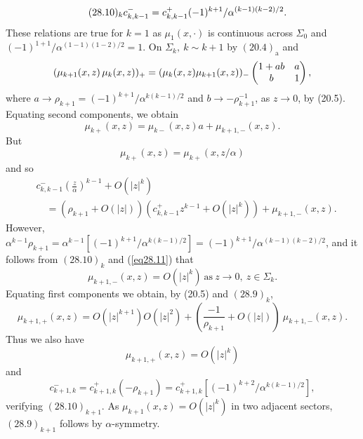 \documentclass{surv-l}
\theoremstyle{plain}
\theoremstyle{definition}
\numberwithin{equation}{chapter}
\begin{document}
\begin{align*}\tag*{$(28.10)_{k}$}
& c_{k,k-1}^{-}=c_{k,k-1}^{+}(-1)^{k+1}/\alpha^{(k-1)(k-2)/2}.
\end{align*}
These relations are true for $k=1$ as $\mu_{1}(x, \cdot)$ is continuous across $\Sigma_{0}$ and $(-1)^{1+1}/\alpha^{(1-1)(1-2)/2}=1$. On $\Sigma_{k},\ k\sim k+1$ by $(20.4)_{\mathrm{a}}$ and
\begin{equation*}
(\mu_{k+1}(x, z)\,\mu_{k}(x,z))_{+}=(\mu_{k}
(x, z)\mu_{k+1}(x, z))_{-}\left(\begin{array}{@{}cc@{}}
1+ab & a\\
b  &1
\end{array}\right),
\end{equation*}
where $a\rightarrow\rho_{k+1}=(-1)^{k+1}/\alpha^{k(k-1)/2}$ and $b\rightarrow-\rho_{k+1}^{-1}$, as $z\rightarrow 0$, by (20.5).
 Equating second components, we obtain
\begin{equation*}
\mu_{k+} (x, z) =\mu_{k-}(x,z)a+\mu_{k+1,-}(x,z).
\end{equation*}
But
\begin{equation*}
\mu_{k+}(x, z)=\mu_{k+}(x, z/\alpha)
\end{equation*}
and so
\setcounter{equation}{10}
\begin{align}\label{eq28.11}
&c_{k,k-1}^{-}\left(\frac{z}{\alpha}\right)^{k-1}+O(|z|^{k})\\
&\quad=(\rho_{k+1}+O(|z|))(c_{k
,k-1}^{+}z^{k-1}+O(|z|^{k}))+\mu_{k+1,-}(x,z).\nonumber
\end{align}
However, $\alpha^{k-1}\rho_{k+1}=\alpha^{k-1}[(-1)^{k+1}/\alpha^{k(k-1)/2}]=(-1)^{k+1}/\alpha^{(k-1)(k-2)/2}$, and it follows from $(28.10)_{k}$ and (\ref{eq28.11}) that
\begin{equation}\label{eq28.12}
\mu_{k+1,-}(x,z)=O(|z|^{k})\ \mathrm{as}\ z\rightarrow 0,\ z\in\Sigma_{k}.
\end{equation}
Equating first components we obtain, by (20.5) and $(28.9)_{k}$,
\begin{equation*}
\mu_{k+1,+}(x,z) = O(|z|^{k+1})O(|z|^{2})+\left(\frac{-1}{\rho_{k+1}}+O(|z|)\right)\ \mu_{k+1,-}(x, z).
\end{equation*}
Thus we also have
\begin{equation*}
\mu_{k+1,+}(x,z)=O(|z|^{k})
\end{equation*}
and
\begin{equation*}
c_{k+1,k}^{-}=c_{k+1,k}^{+}(-\rho_{k+1})=c_{k+1,k}^{+}[(-1)^{k+2}/\alpha^{k(k-1)/2}],
\end{equation*}
verifying $(28.10)_{k+1}$. As $\mu_{k+1}(x,z)=O(|z|^{k})$ in two adjacent sectors, $(28.9)_{k+1}$ follows by $\alpha$-symmetry.
\end{document}
